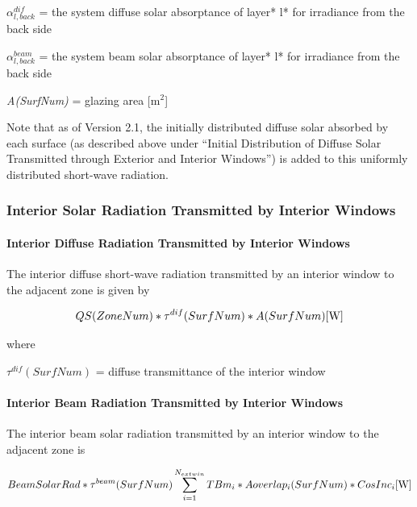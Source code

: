 \(\alpha_{l,back}^{dif}\) = the system diffuse solar absorptance of layer* l* for irradiance from the back side

\(\alpha_{l,back}^{beam}\) = the system beam solar absorptance of layer* l* for irradiance from the back side

\emph{A(SurfNum)} = glazing area {[}m\(^{2}\){]}

Note that as of Version 2.1, the initially distributed diffuse solar absorbed by each surface (as described above under ``Initial Distribution of Diffuse Solar Transmitted through Exterior and Interior Windows'') is added to this uniformly distributed short-wave radiation.

\subsubsection{Interior Solar Radiation Transmitted by Interior Windows}\label{interior-solar-radiation-transmitted-by-interior-windows}

\paragraph{Interior Diffuse Radiation Transmitted by Interior Windows}\label{interior-diffuse-radiation-transmitted-by-interior-windows}

The interior diffuse short-wave radiation transmitted by an interior window to the adjacent zone is given by

\begin{equation}
QS(ZoneNum)*{\tau ^{dif}}(SurfNum)*A(SurfNum){\rm{    [W]}}
\end{equation}

where

\({\tau ^{dif}}(SurfNum)\) = diffuse transmittance of the interior window

\paragraph{Interior Beam Radiation Transmitted by Interior Windows}\label{interior-beam-radiation-transmitted-by-interior-windows}

The interior beam solar radiation transmitted by an interior window to the adjacent zone is

\begin{equation}
BeamSolarRad*{\tau ^{beam}}(SurfNum)\sum\limits_{i = 1}^{{N_{extwin}}} {TB{m_i}*Aoverla{p_i}(SurfNum)*CosIn{c_i}{\rm{    [W}}]}
\end{equation}

